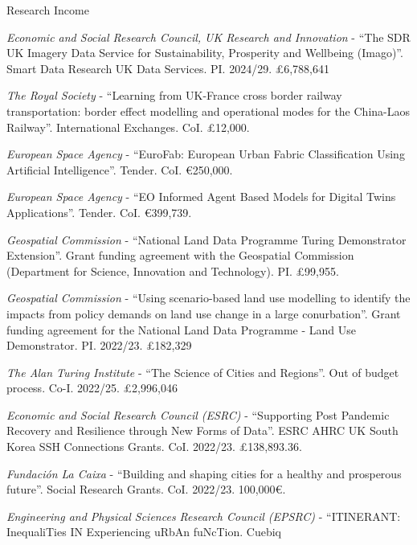 \documentclass[12pt,2up]{article}
\begin{document}
\begin{cv}{}
\begin{cvlist}{Research Income}
\item[\textbf{Awards}]
\item[2024] \emph{Economic and Social Research Council, UK Research and
        Innovation} - ``The SDR UK Imagery
        Data Service for Sustainability, Prosperity and Wellbeing (Imago)''.
        Smart Data Research UK Data Services. PI. 2024/29. \pounds6,788,641
\item[] \emph{The Royal Society} - ``Learning from UK-France cross border railway transportation:
        border effect modelling and operational modes for the China-Laos Railway''.
        International Exchanges. CoI. \pounds12,000.
\item[] \emph{European Space Agency} - ``EuroFab: European Urban Fabric
        Classification Using Artificial Intelligence''.
        Tender. CoI. \euro250,000.
\item[] \emph{European Space Agency} - ``EO Informed Agent Based Models
        for Digital Twins Applications''. Tender. CoI. \euro399,739.
\item[2023] \emph{Geospatial Commission} - ``National Land Data Programme
        Turing Demonstrator Extension''. 
        Grant funding agreement with the Geospatial Commission (Department for
        Science, Innovation and Technology). PI. \pounds99,955.
\item[2022] \emph{Geospatial Commission} -
        ``Using scenario-based land use modelling to identify the impacts from
        policy demands on land use change in a large conurbation''.
        Grant funding agreement for the National Land Data Programme - Land
        Use Demonstrator. PI. 2022/23. \pounds182,329
\item[] \emph{The Alan Turing Institute} -
        ``The Science of Cities and Regions''. Out of budget process. Co-I.
        2022/25. \pounds2,996,046
\item[] \emph{Economic and Social Research Council (ESRC)} -
``Supporting Post Pandemic Recovery and Resilience through New Forms of Data''.
ESRC AHRC UK South Korea SSH Connections Grants. CoI. 2022/23. \pounds138,893.36.
\item[] \emph{Fundaci\'{o}n La Caixa} -
    ``Building and shaping cities for a healthy and prosperous future''.
    Social Research Grants. CoI. 2022/23. 100,000\euro.
\item[] \emph{Engineering and Physical Sciences Research Council (EPSRC)}
        - ``ITINERANT: InequaliTies IN Experiencing uRbAn fuNcTion. Cuebiq

\end{cvlist}
\end{cv}
\end{document}
